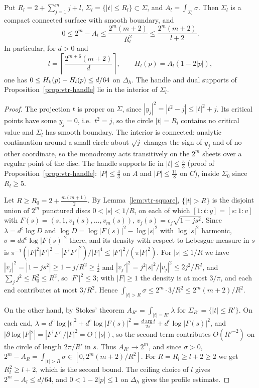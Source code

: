 \begin{lemma}\label{lem:vtr-tail}
Put $R_l=2+\sum_{j=1}^m j+l$, $\Sigma_l=\{|t|\le R_l\}\subset\Sigma$, and $A_l=\int_{\Sigma_l}\sigma$. Then $\Sigma_l$ is a compact
connected surface with smooth boundary, and
\[
 0\le2^m-A_l\le\frac{2^m(m+2)}{R_l^2}
 \le\frac{2^m(m+2)}{l+2}.
\]
In particular, for $d>0$ and
\[
 l=\left\lceil\frac{2^{m+6}(m+2)}d\right\rceil,
 \qquad H_l(p)=A_l(1-2|p|),
\]
one has $0\le H_{\mathrm b}(p)-H_l(p)\le d/64$ on $\Delta_h$. The handle and dual supports of Proposition~\ref{prop:vtr-handle} lie in the
interior of $\Sigma_l$.
\end{lemma}

\begin{proof}
The projection $t$ is proper on $\Sigma$, since $|y_j|^2=|t^2-j|\le|t|^2+j$. Its critical points have some $y_j=0$, i.e.\ $t^2=j$,
so the circle $|t|=R_l$ contains no critical value and $\Sigma_l$ has smooth boundary. The interior is connected: analytic
continuation around a small circle about $\sqrt j$ changes the sign of $y_j$ and of no other coordinate, so the monodromy acts
transitively on the $2^m$ sheets over a regular point of the disc. The handle supports lie in $|t|\le\frac53$ (proof of
Proposition~\ref{prop:vtr-handle}: $|P|\le\frac43$ on $A$ and $|P|\le\frac{11}8$ on $C$), inside $\Sigma_0$ since $R_l\ge5$.

Let $R\ge R_0=2+\frac{m(m+1)}2$. By Lemma~\ref{lem:vtr-square}, $\{|t|>R\}$ is the disjoint union of $2^m$ punctured discs
$0<|s|<1/R$, on each of which $[1:t:y]=[s:1:v]$ with $F(s)=(s,1,v_1(s),\dots,v_m(s))$, $v_j(s)=\epsilon_j\sqrt{1-js^2}$. Since
$\lambda=d^c\log D$ and $\log D=\log|F(s)|^2-\log|s|^2$ with $\log|s|^2$ harmonic, $\sigma=dd^c\log|F(s)|^2$ there, and its density
with respect to Lebesgue measure in $s$ is $\pi^{-1}(|F|^2|F'|^2-|F^\dagger F'|^2)/|F|^4\le|F'|^2/(\pi|F|^2)$. For $|s|\le1/R$ we
have $|v_j|^2=|1-js^2|\ge1-j/R^2\ge\frac12$ and $|v_j'|^2=j^2|s|^2/|v_j|^2\le2j^2/R^2$, and $\sum_jj^2\le R_0^2\le R^2$, so
$|F'|^2\le3$; with $|F|\ge1$ the density is at most $3/\pi$, and each end contributes at most $3/R^2$. Hence
$\int_{|t|>R}\sigma\le2^m\cdot3/R^2\le2^m(m+2)/R^2$.

On the other hand, by Stokes' theorem $A_{R'}=\int_{|t|=R'}\lambda$ for $\Sigma_{R'}=\{|t|\le R'\}$. On each end,
$\lambda=d^c\log|t|^2+d^c\log|F(s)|^2=\frac{d\arg t}{2\pi}+d^c\log|F(s)|^2$, and $|\partial\log|F|^2|=|F^\dagger F'|/|F|^2=O(|s|)$,
so the second term contributes $O(R'^{-2})$ on the circle of length $2\pi/R'$ in $s$. Thus $A_{R'}\to2^m$, and since $\sigma>0$,
$2^m-A_R=\int_{|t|>R}\sigma\in[0,2^m(m+2)/R^2]$. For $R=R_l\ge l+2\ge2$ we get $R_l^2\ge l+2$, which is the second bound. The
ceiling choice of $l$ gives $2^m-A_l\le d/64$, and $0<1-2|p|\le1$ on $\Delta_h$ gives the profile estimate.
\end{proof}

